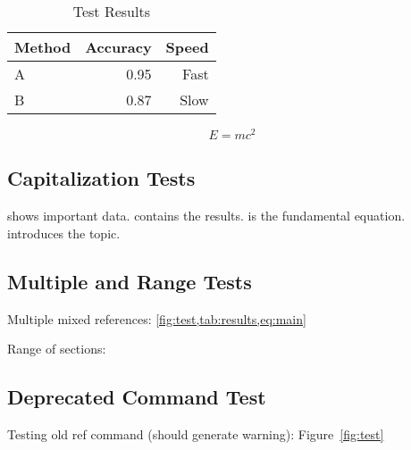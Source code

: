 \documentclass[11pt,letterpaper]{article}
\begin{document}
\begin{table}[h]
  \caption{Test Results}
  \label{tab:results}
  \centering
  \begin{tabular}{lrr}
    \toprule
    Method & Accuracy & Speed \\
    \midrule
    A & 0.95 & Fast \\
    B & 0.87 & Slow \\
    \bottomrule
  \end{tabular}
\end{table}

\begin{equation}
  E = mc^2
  \label{eq:main}
\end{equation}

\subsection{Capitalization Tests}
\label{subsec:caps}

 shows important data.  contains the results. 
 is the fundamental equation.  introduces the topic.

\subsection{Multiple and Range Tests}

Multiple mixed references: \cref{fig:test,tab:results,eq:main}

Range of sections: 

\subsection{Deprecated Command Test}

Testing old ref command (should generate warning): Figure~\ref{fig:test}
\end{document}
